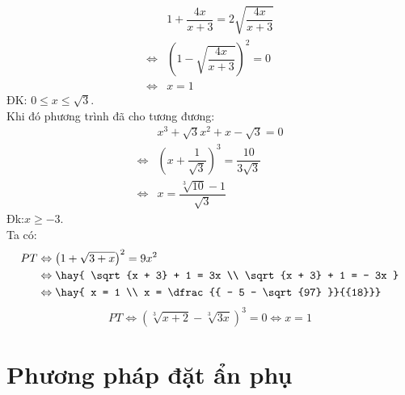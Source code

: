\begin{align*}
& 1 + \dfrac{{4x}}{{x + 3}} = 2\sqrt {\dfrac{{4x}}{{x + 3}}} \\
 \Leftrightarrow & \left( {1 - \sqrt {\dfrac{{4x}}{{x + 3}}} } \right)^2 = 0 \\
  \Leftrightarrow & x = 1
\end{align*}
\hda
ĐK: $0 \le x \le \sqrt 3 $. \\
Khi đó phương trình đã cho tương đương: 
\begin{align*} & x^3 + \sqrt 3 x^2 + x - \sqrt 3 = 0 \\
 \Leftrightarrow & \left( {x + \dfrac{1}{{\sqrt 3 }}} \right)^3 = \dfrac{{10}}{{3\sqrt 3 }} \\
 \Leftrightarrow & x = \dfrac{{\sqrt[3]{{10}} - 1}}{{\sqrt 3 }} \end{align*}
\hda
Đk:$x \ge - 3$.\\
Ta có:
\begin{align*}
PT & \Leftrightarrow \left( {1 + \sqrt {3 + x} } \right)^2 = 9x^2 \\
& \Leftrightarrow \hay{
 \sqrt {x + 3} + 1 = 3x \\ 
 \sqrt {x + 3} + 1 = - 3x } \\
 & \Leftrightarrow \hay{ x = 1 \\  x = \dfrac{{ - 5 - \sqrt {97} }}{{18}}}\end{align*}
\hda
$$PT \Leftrightarrow \left( {\sqrt[3]{{x + 2}} - \sqrt[3]{{3x}}} \right)^3 = 0 \Leftrightarrow x = 1$$
\section{Phương pháp đặt ẩn phụ}
